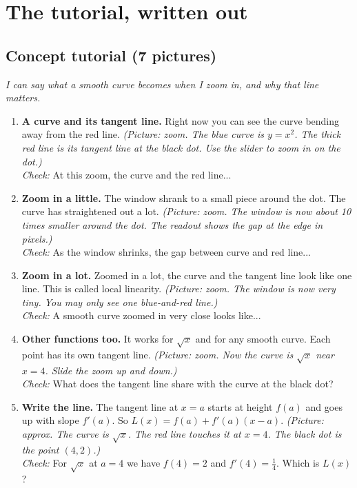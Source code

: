 \documentclass[11pt]{article}
\begin{document}
\section*{The tutorial, written out}
\subsection*{Concept tutorial (7 pictures)}
\textit{I can say what a smooth curve becomes when I zoom in, and why that line matters.}\par
\begin{enumerate}
\item \textbf{A curve and its tangent line.} Right now you can see the curve bending away from the red line. \textit{(Picture: zoom. The blue curve is $y=x^2$. The thick red line is its tangent line at the black dot. Use the slider to zoom in on the dot.)}\\ \textit{Check:} At this zoom, the curve and the red line... 
\item \textbf{Zoom in a little.} The window shrank to a small piece around the dot. The curve has straightened out a lot. \textit{(Picture: zoom. The window is now about 10 times smaller around the dot. The readout shows the gap at the edge in pixels.)}\\ \textit{Check:} As the window shrinks, the gap between curve and red line... 
\item \textbf{Zoom in a lot.} Zoomed in a lot, the curve and the tangent line look like one line. This is called local linearity. \textit{(Picture: zoom. The window is now very tiny. You may only see one blue-and-red line.)}\\ \textit{Check:} A smooth curve zoomed in very close looks like... 
\item \textbf{Other functions too.} It works for $\sqrt{x}$ and for any smooth curve. Each point has its own tangent line. \textit{(Picture: zoom. Now the curve is $\sqrt{x}$ near $x=4$. Slide the zoom up and down.)}\\ \textit{Check:} What does the tangent line share with the curve at the black dot? 
\item \textbf{Write the line.} The tangent line at $x=a$ starts at height $f(a)$ and goes up with slope $f'(a)$. So $L(x)=f(a)+f'(a)(x-a)$. \textit{(Picture: approx. The curve is $\sqrt{x}$. The red line touches it at $x=4$. The black dot is the point $(4,2)$.)}\\ \textit{Check:} For $\sqrt{x}$ at $a=4$ we have $f(4)=2$ and $f'(4)=\tfrac14$. Which is $L(x)$? 

\end{enumerate}
\end{document}
